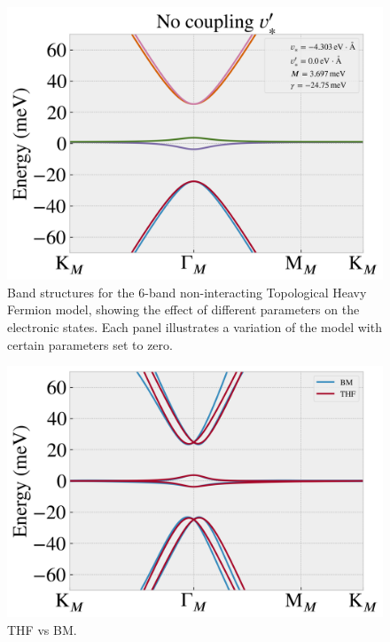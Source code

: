 \begin{figure}[H]
\includegraphics[height=0.35\linewidth]{fig/thf-no_coupling.png}
\caption{Band structures for the 6-band non-interacting Topological Heavy Fermion model, showing the effect of different parameters on the electronic states. Each panel illustrates a variation of the model with certain parameters set to zero.}
\label{fig:thf-exploration}
\end{figure}

\begin{figure}[H]
\centering
\includegraphics[width=0.9\linewidth]{fig/thf_continuum_model_vF_1.3_factor_N1.png}
\caption{THF vs BM.}
\label{fig:THF_vs_BM}
\end{figure}







%



